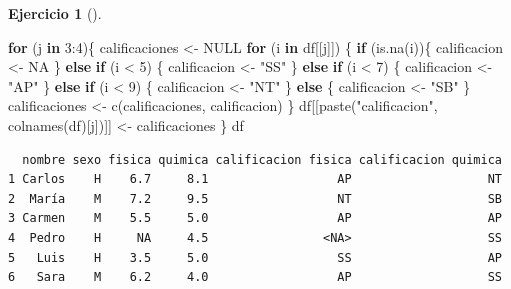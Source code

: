 \documentclass[
  spanish,
  a4paper,
]{scrreport}
\newenvironment{Shaded}{\begin{snugshade}}{\end{snugshade}}
\newcommand{\ConstantTok}[1]{\textcolor[rgb]{0.56,0.35,0.01}{#1}}
\newcommand{\ControlFlowTok}[1]{\textcolor[rgb]{0.00,0.23,0.31}{\textbf{#1}}}
\newcommand{\DecValTok}[1]{\textcolor[rgb]{0.68,0.00,0.00}{#1}}
\newcommand{\FunctionTok}[1]{\textcolor[rgb]{0.28,0.35,0.67}{#1}}
\newcommand{\NormalTok}[1]{\textcolor[rgb]{0.00,0.23,0.31}{#1}}
\newcommand{\OtherTok}[1]{\textcolor[rgb]{0.00,0.23,0.31}{#1}}
\newcommand{\SpecialCharTok}[1]{\textcolor[rgb]{0.37,0.37,0.37}{#1}}
\newcommand{\StringTok}[1]{\textcolor[rgb]{0.13,0.47,0.30}{#1}}
\theoremstyle{definition}
\newtheorem{exercise}{Ejercicio}[chapter]
\theoremstyle{definition}
\theoremstyle{remark}
\begin{document}
\begin{exercise}[]
\begin{enumerate}
\begin{tcolorbox}
\begin{Shaded}
\begin{Highlighting}[]
\ControlFlowTok{for}\NormalTok{ (j }\ControlFlowTok{in} \DecValTok{3}\SpecialCharTok{:}\DecValTok{4}\NormalTok{)\{}
\NormalTok{  calificaciones }\OtherTok{\textless{}{-}} \ConstantTok{NULL}
  \ControlFlowTok{for}\NormalTok{ (i }\ControlFlowTok{in}\NormalTok{ df[[j]]) \{}
    \ControlFlowTok{if}\NormalTok{ (}\FunctionTok{is.na}\NormalTok{(i))\{}
\NormalTok{      calificacion }\OtherTok{\textless{}{-}} \ConstantTok{NA} 
\NormalTok{    \} }\ControlFlowTok{else} \ControlFlowTok{if}\NormalTok{ (i }\SpecialCharTok{\textless{}} \DecValTok{5}\NormalTok{) \{}
\NormalTok{      calificacion }\OtherTok{\textless{}{-}} \StringTok{"SS"}
\NormalTok{    \} }\ControlFlowTok{else} \ControlFlowTok{if}\NormalTok{ (i }\SpecialCharTok{\textless{}} \DecValTok{7}\NormalTok{) \{}
\NormalTok{      calificacion }\OtherTok{\textless{}{-}} \StringTok{"AP"}
\NormalTok{    \} }\ControlFlowTok{else} \ControlFlowTok{if}\NormalTok{ (i }\SpecialCharTok{\textless{}} \DecValTok{9}\NormalTok{) \{}
\NormalTok{      calificacion }\OtherTok{\textless{}{-}} \StringTok{"NT"}
\NormalTok{    \} }\ControlFlowTok{else}\NormalTok{ \{}
\NormalTok{      calificacion }\OtherTok{\textless{}{-}} \StringTok{"SB"}
\NormalTok{    \}}
\NormalTok{    calificaciones }\OtherTok{\textless{}{-}} \FunctionTok{c}\NormalTok{(calificaciones, calificacion)}
\NormalTok{  \}}
\NormalTok{  df[[}\FunctionTok{paste}\NormalTok{(}\StringTok{"calificacion"}\NormalTok{, }\FunctionTok{colnames}\NormalTok{(df)[j])]] }\OtherTok{\textless{}{-}}\NormalTok{ calificaciones}
\NormalTok{\}}
\NormalTok{df}
\end{Highlighting}
\end{Shaded}

\begin{verbatim}
  nombre sexo fisica quimica calificacion fisica calificacion quimica
1 Carlos    H    6.7     8.1                  AP                   NT
2  María    M    7.2     9.5                  NT                   SB
3 Carmen    M    5.5     5.0                  AP                   AP
4  Pedro    H     NA     4.5                <NA>                   SS
5   Luis    H    3.5     5.0                  SS                   AP
6   Sara    M    6.2     4.0                  AP                   SS
\end{verbatim}

  \end{tcolorbox}
\end{enumerate}

\end{exercise}
\end{document}
